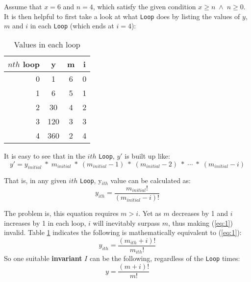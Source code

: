 Assume that $x = 6$ and $n = 4$, which satisfy the given condition $ x \geq n \;\land\; n \geq 0$.  It is then helpful to first take a look at what \texttt{Loop} does by listing the values of $y$, $m$ and $i$ in each \texttt{Loop} (which ends at $i = 4$):

\begin{table}[h]
  \centering
  \begin{tabular}{r||c|c|c}
    \hline
    $nth$ loop & y & m & i \\
    \hline
    0 & 1 & 6 & 0 \\
    1 & 6 & 5 & 1 \\
    2 & 30 & 4 & 2 \\
    3 & 120 & 3 & 3 \\
    4 & 360 & 2 & 4 \\
    \hline
  \end{tabular}
  \caption{Values in each loop}
  \label{tab:loop}
\end{table}

It is easy to see that in the $ith$ \texttt{Loop}, $y'$ is built up like:
\[
  y' =
  y_{initial} \;*\; m_{initial}\;*\;(m_{initial} - 1)\;*\;(m_{initial}-  2)\;*\;\dotsb\;*\; (m_{initial} - i)
\]

That is, in any given $ith$ \texttt{Loop},  y$_{ith}$ value can be calculated as:
\begin{equation}
\label{eq:1}
y_{ith} = \frac{m_{initial}!}{(m_{initial} - i)!}
\end{equation}

The problem is, this equation requires $m > i$.  Yet as $m$ decreases by 1 and $i$ increases by 1 in each loop, $i$ will inevitably surpass $m$, thus making (\ref{eq:1}) invalid.  Table \ref{tab:loop} indicates the following is mathematically equivalent to (\ref{eq:1}):
\[
y_{ith} = \frac{(m_{ith}+i)!}{m_{ith}!}
\]
So one suitable \textbf{invariant} \(I\) can be the following, regardless of the \texttt{Loop} times:
\begin{equation}
\label{eq:2}
  y = \frac{(m+i)!}{m!}
\end{equation}

